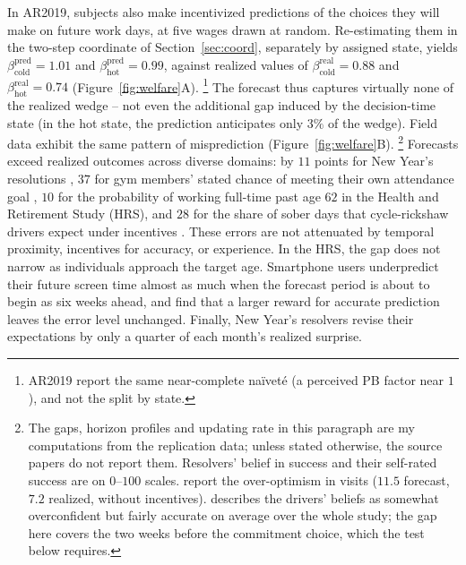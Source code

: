 \documentclass[11pt,a4paper]{article}
\theoremstyle{plain}
\theoremstyle{definition}
\begin{document}
\noindent
In AR2019, subjects also make incentivized predictions of the choices they will make on future work days, at five wages drawn at random.
Re-estimating them in the two-step coordinate of Section~\ref{sec:coord}, separately by assigned state, yields $\beta_{\text{cold}}^{\text{pred}} = 1.01$ and $\beta_{\text{hot}}^{\text{pred}} = 0.99$, against realized values of $\beta_{\text{cold}}^{\text{real}} = 0.88$ and $\beta_{\text{hot}}^{\text{real}} = 0.74$ (Figure~\ref{fig:welfare}A).%
\footnote{AR2019 report the same near-complete na\"ivet\'e %
(a perceived PB factor near $1$), and not the split by state.} 
The forecast thus captures virtually none of the realized wedge -- not even the additional gap induced by the decision-time state 
(in the hot state, the prediction anticipates only $3\%$ of the wedge).
Field data exhibit the same pattern of misprediction (Figure~\ref{fig:welfare}B).%
\footnote{The gaps, horizon profiles and updating rate in this paragraph are my computations from the replication data; unless stated otherwise, the source papers do not report them. Resolvers' belief in success and their self-rated success are on $0$--$100$ scales. \citet{carrera2022} report the over-optimism in visits ($11.5$ forecast, $7.2$ realized, without incentives). \citet{schilbach2019} describes the drivers' beliefs as somewhat overconfident but fairly accurate on average over the whole study; the gap here covers the two weeks before the commitment choice, which the test below requires.}
Forecasts exceed realized outcomes across diverse domains: by $11$ points for New Year's resolutions \citep{oscarsson2020}, $37$ for gym members' stated chance of meeting their own attendance goal \citep{carrera2022}, $10$ for the probability of working full-time past age $62$ in the Health and Retirement Study (HRS), and $28$ for the share of sober days that cycle-rickshaw drivers expect under incentives \citep{schilbach2019}.
These %
errors are not attenuated by temporal proximity, incentives for accuracy, or experience. In the HRS, the gap does not narrow as individuals approach the target age. Smartphone users underpredict their future screen time almost as much when the forecast period is about to begin as six weeks ahead, and \citet{allcott2022} find that a larger reward for accurate prediction leaves the error level unchanged. Finally, New Year's resolvers revise their %
expectations by only a quarter of each month's realized surprise.
\end{document}
